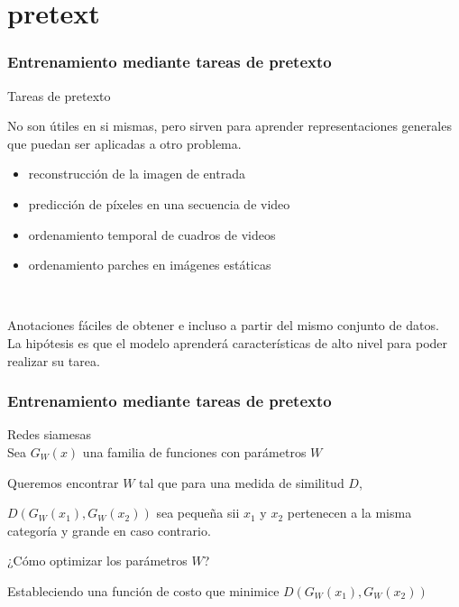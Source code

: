 \documentclass{beamer}
\begin{document}
\section{pretext}
\begin{frame}
\frametitle{Entrenamiento mediante tareas de pretexto}
Tareas de pretexto \\\vfill

No son útiles en si mismas, pero sirven para aprender representaciones generales que puedan ser aplicadas a otro problema.\\\vfill
	
\begin{itemize}
    \item reconstrucción de la imagen de entrada
    \item predicción de píxeles en una secuencia de video 
    \item ordenamiento temporal de cuadros de videos
    \item ordenamiento parches en imágenes estáticas
\end{itemize}\\
\vfill

Anotaciones fáciles de obtener e incluso a partir del mismo conjunto de datos. \\
\vfill
La hipótesis es que el modelo aprenderá características de alto nivel para poder realizar su tarea.
\vfill
\end{frame}





\begin{frame}
\frametitle{Entrenamiento mediante tareas de pretexto}
Redes siamesas\\
\vfill
Sea \(G_W(x)\) una familia de funciones con parámetros \(W\)\\
\vfill
	
Queremos encontrar \(W\) tal que para una medida de similitud \(D\),\\

\vfill
	
\(D(G_W(x_1), G_W(x_2))\) sea pequeña sii \(x_1\) y \(x_2\) pertenecen a la misma categoría y
grande en caso contrario.\pause 
\vfill
	
	
¿Cómo optimizar los parámetros \(W\)?\\\pause
\vfill

Estableciendo una función de costo que minimice \(D(G_W(x_1), G_W(x_2))\)
\end{frame}
\end{document}
